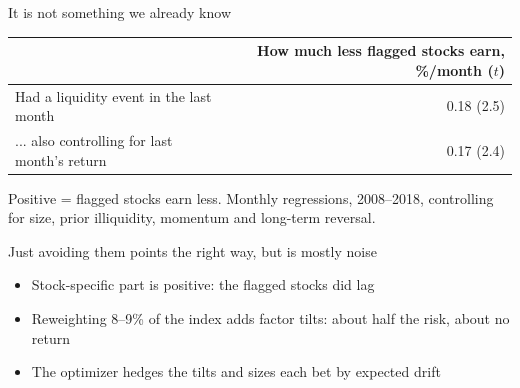 \documentclass[aspectratio=169,11pt]{beamer}
\begin{document}
\begin{frame}{It is not something we already know}
\centering
\small
\begin{tabular}{lr}
\toprule
 & How much less flagged stocks earn, \%/month ($t$) \\
\midrule
Had a liquidity event in the last month & 0.18 (2.5) \\
... also controlling for last month's return & 0.17 (2.4) \\
\bottomrule
\end{tabular}

\medskip
\raggedright\footnotesize Positive = flagged stocks earn less. Monthly regressions, 2008--2018, controlling for size, prior illiquidity, momentum and long-term reversal.
\end{frame}

\begin{frame}{Just avoiding them points the right way, but is mostly noise}
\centering
\small
{}

\medskip
\raggedright
\begin{itemize}
\item Stock-specific part is positive: the flagged stocks did lag
\item Reweighting 8--9\% of the index adds factor tilts: about half the risk, about no return
\item The optimizer hedges the tilts and sizes each bet by expected drift
\end{itemize}
\end{frame}
\end{document}
